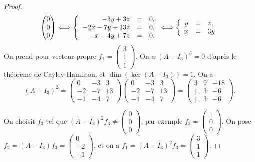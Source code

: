 \documentclass[12pt]{article}
\begin{document}
\begin{proof}
\begin{equation}
\begin{pmatrix}
			0\\0\\0
		\end{pmatrix}\Longleftrightarrow
		\left\lbrace
			\begin{array}[]{rcl}
				-3y+3z &=& 0,\\
				-2x-7y+13z &=& 0,\\
				-x-4y+7z &=&0. 
			\end{array}
		\right.
		\Longleftrightarrow
		\left\lbrace
			\begin{array}[]{rcl}
				y&=&z,\\
				x&=&3y
			\end{array}
		\right.
	\end{equation}
	On prend pour vecteur propre $f_1=\begin{pmatrix}
		3\\1\\1
	\end{pmatrix}$. On a $(A-I_3)^{3}=0$ d'après le théorème de Cayley-Hamilton, et $\dim(\ker(A-I_3))=1$. On a 
	\begin{equation}
		(A-I_3)^{2}=
		\begin{pmatrix}
			0&-3&3\\
			-2&-7&13\\
			-1&-4&7
		\end{pmatrix}
		\begin{pmatrix}
			0&-3&3\\
			-2&-7&13\\
			-1&-4&7
		\end{pmatrix}
		=
		\begin{pmatrix}
			3&9&-18\\
			1&3&-6\\
			1&3&-6
		\end{pmatrix}.
	\end{equation}

	On choisit $f_3$ tel que $(A-I_3)^{2}f_3\neq\begin{pmatrix}
		0\\0\\0
	\end{pmatrix}$, par exemple $f_3=\begin{pmatrix}
		1\\0\\0
	\end{pmatrix}$. On pose $f_2=(A-I_3)f_3=\begin{pmatrix}
		0\\-2\\-1
	\end{pmatrix}$, et on a $f_1=(A-I_3)^{2}f_3
	=
	\begin{pmatrix}
		3\\1\\1
	\end{pmatrix}$.


\end{proof}
\end{document}

